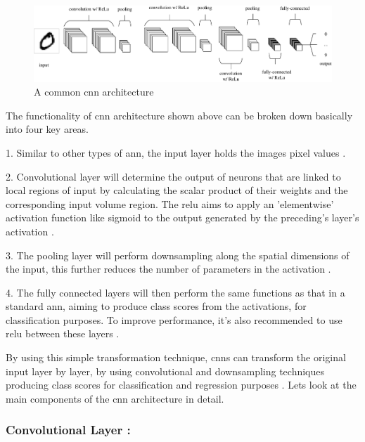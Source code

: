 \begin{figure}[ht!]
    \centering
    \includegraphics[width=1.1\linewidth]{Rohit_Master_Thesis//Images/cnn_architecture.pdf}
    \caption{A common \gls{cnn} architecture \cite{oshea2015introductionconvolutionalneuralnetworks}}
    \label{fig:cnn architecture}
\end{figure}

The functionality of \gls{cnn} architecture shown above can be broken down basically into four key areas.

1. Similar to other types of \gls{ann}, the input layer holds the images pixel values \cite{oshea2015introductionconvolutionalneuralnetworks}.

2. Convolutional layer will determine the output of neurons that are linked to local regions of input by calculating the scalar product of their weights and the corresponding input volume region. The \gls{relu} aims to apply an 'elementwise' activation function like sigmoid to the output generated by the preceding's layer's activation \cite{oshea2015introductionconvolutionalneuralnetworks}.

3. The pooling layer will perform downsampling along the spatial dimensions of the input, this further reduces the number of parameters in the activation \cite{oshea2015introductionconvolutionalneuralnetworks}.

4. The fully connected layers will then perform the same functions as that in a standard \gls{ann}, aiming to produce class scores from the activations, for classification purposes. To improve performance, it's also recommended to use \gls{relu} between these layers \cite{oshea2015introductionconvolutionalneuralnetworks}. 

By using this simple transformation technique, \glspl{cnn} can transform the original input layer by layer, by using convolutional and downsampling techniques producing class scores for classification and regression purposes \cite{oshea2015introductionconvolutionalneuralnetworks}. Lets look at the main components of the \gls{cnn} architecture in detail.

\subsubsection*{Convolutional Layer :}

